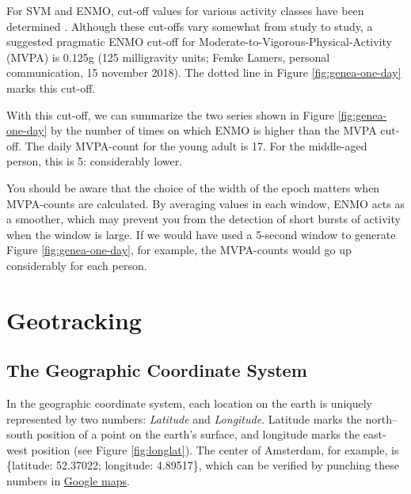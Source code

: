 \documentclass[]{book}
\begin{document}

For SVM and ENMO, cut-off values for various activity classes have been
determined \citep{Dasilva2014, Hildebrand2014, Kim2017, Rowlands2016}.
Although these cut-offs vary somewhat from study to study, a suggested
pragmatic ENMO cut-off for Moderate-to-Vigorous-Physical-Activity (MVPA)
is 0.125g (125 milligravity units; Femke Lamers, personal communication,
15 november 2018). The dotted line in Figure \ref{fig:genea-one-day}
marks this cut-off.

With this cut-off, we can summarize the two series shown in Figure
\ref{fig:genea-one-day} by the number of times on which ENMO is higher
than the MVPA cut-off. The daily MVPA-count for the young adult is 17.
For the middle-aged person, this is 5: considerably lower.

You should be aware that the choice of the width of the epoch matters
when MVPA-counts are calculated. By averaging values in each window,
ENMO acts as a smoother, which may prevent you from the detection of
short bursts of activity when the window is large. If we would have used
a 5-second window to generate Figure \ref{fig:genea-one-day}, for
example, the MVPA-counts would go up considerably for each person.

\section{Geotracking}\label{geotracking}


\subsection{The Geographic Coordinate
System}\label{the-geographic-coordinate-system}

  

In the geographic coordinate system, each location on the earth is
uniquely represented by two numbers: \emph{Latitude} and
\emph{Longitude}. Latitude marks the north--south position of a point on
the earth's surface, and longitude marks the east-west position (see
Figure \ref{fig:longlat}). The center of Amsterdam, for example, is
\{latitude: 52.37022; longitude: 4.89517\}, which can be verified by
punching these numbers in \href{https://tinyurl.com/ybxxk99a}{Google
maps}.
\end{document}
